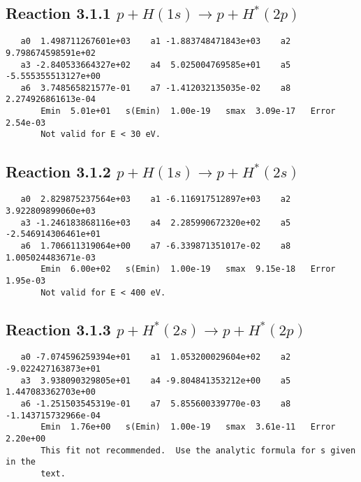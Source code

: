 \documentclass[12pt]{article}
\begin{document}
\newpage
\subsection{Reaction 3.1.1 $   p + H(1s) \rightarrow p + H^*(2p)$}


\begin{small}\begin{verbatim}
   a0  1.498711267601e+03    a1 -1.883748471843e+03    a2  9.798674598591e+02
   a3 -2.840533664327e+02    a4  5.025004769585e+01    a5 -5.555355513127e+00
   a6  3.748565821577e-01    a7 -1.412032135035e-02    a8  2.274926861613e-04
       Emin  5.01e+01   s(Emin)  1.00e-19   smax  3.09e-17   Error  2.54e-03
       Not valid for E < 30 eV.
\end{verbatim}\end{small}


\newpage
\subsection{Reaction 3.1.2 $   p + H(1s) \rightarrow p + H^*(2s)$}


\begin{small}\begin{verbatim}
   a0  2.829875237564e+03    a1 -6.116917512897e+03    a2  3.922809899060e+03
   a3 -1.246183868116e+03    a4  2.285990672320e+02    a5 -2.546914306461e+01
   a6  1.706611319064e+00    a7 -6.339871351017e-02    a8  1.005024483671e-03
       Emin  6.00e+02   s(Emin)  1.00e-19   smax  9.15e-18   Error  1.95e-03
       Not valid for E < 400 eV.
\end{verbatim}\end{small}

\newpage
\subsection{
Reaction 3.1.3 $   p + H^*(2s) \rightarrow p + H^*(2p)$}


\begin{small}\begin{verbatim}
   a0 -7.074596259394e+01    a1  1.053200029604e+02    a2 -9.022427163873e+01
   a3  3.938090329805e+01    a4 -9.804841353212e+00    a5  1.447083362703e+00
   a6 -1.251503545319e-01    a7  5.855600339770e-03    a8 -1.143715732966e-04
       Emin  1.76e+00   s(Emin)  1.00e-19   smax  3.61e-11   Error  2.20e+00
       This fit not recommended.  Use the analytic formula for s given in the
       text.
\end{verbatim}\end{small}
\end{document}

